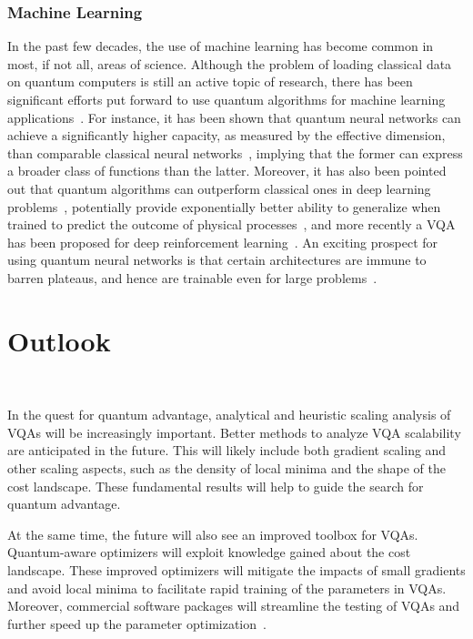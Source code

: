 \documentclass[prx,twocolumn,floatfix,superscriptaddress,longbibliography]{revtex4-1}
\newcommand{\<}{\langle}
\renewcommand{\>}{\rangle}
\begin{document}
\subsubsection{Machine Learning} In the past few decades, the use of machine learning has become common in most, if not all, areas of science. Although the problem of loading classical data on quantum computers is still an active topic of research, there has been significant efforts put forward to use quantum algorithms for machine learning applications~\cite{schuld2015introduction,schuld2019quantum,romero2019variational,biamonte2017quantum}. For instance, it has been shown that quantum neural networks can achieve a significantly higher capacity, as measured by the effective dimension, than comparable classical neural networks~\cite{abbas2020power}, implying that the former can express a broader class of functions than the latter. Moreover, it has also been pointed out that quantum algorithms can outperform classical ones in deep  learning problems~\cite{wiebe2014quantum}, potentially provide exponentially better ability to generalize when trained to predict the outcome of physical processes~\cite{huang2021information}, and more recently a VQA has been proposed for deep reinforcement learning~\cite{chen2020variational}. An exciting prospect for using quantum neural networks is that certain architectures are immune to barren plateaus, and hence are trainable even for large problems~\cite{pesah2020absence,zhang2020toward}.   

\section{ Outlook}~\label{sec:7}

In the quest for quantum advantage, analytical and heuristic scaling analysis of VQAs will be increasingly important. Better methods to analyze VQA scalability are anticipated in the future. This will likely include both gradient scaling and other scaling aspects, such as the density of local minima and the shape of the cost landscape. These fundamental results will help to guide the search for quantum advantage.



At the same time, the future will also see an improved toolbox for VQAs. Quantum-aware optimizers will exploit knowledge gained about the cost landscape. These improved optimizers will mitigate the impacts of small gradients and avoid local minima to facilitate rapid training of the parameters in VQAs. Moreover, commercial software packages will streamline the testing of VQAs and further speed up the parameter optimization~\cite{bergholm2018pennylane,broughton2020tensorflow,luo2020yao}.
\end{document}
